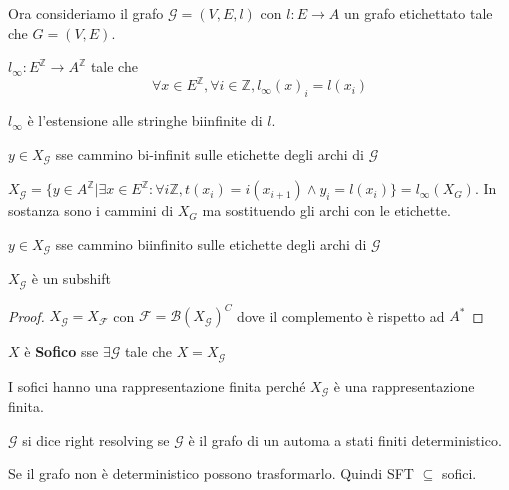 Ora consideriamo il grafo $\mathcal{G}=(V,E,l)$ con $l:E\to A$ un grafo etichettato 
tale che $G=(V,E)$.
\begin{definizione}
    $l_\infty:E^\mathbb{Z}\to A^\mathbb{Z}$ tale che 
    $$\forall x\in E^\mathbb{Z}, \forall i \in \mathbb{Z}, l_\infty(x)_i = l(x_i)$$
\end{definizione}
\begin{nota}
    $l_\infty$ è l'estensione alle stringhe biinfinite di $l$.
\end{nota}
\begin{nota}
    $y\in X_\mathcal{G}$ sse cammino bi-infinit sulle etichette degli archi di $\mathcal{G}$
\end{nota}

\begin{definizione}
    $X_\mathcal{G}= \{y\in A^\mathbb{Z}|\exists x\in E^\mathbb{Z} : \forall i \mathbb{Z}, t(x_i) = i(x_{i+1})\land y_i=l(x_i)\}=l_\infty(X_G)$.
    In sostanza sono i cammini di $X_G$ ma sostituendo gli archi con le etichette.
    
\end{definizione}

\begin{osservazione}
    $y\in X_\mathcal{G}$ sse cammino biinfinito sulle etichette degli archi di $\mathcal{G}$
\end{osservazione}
\begin{nota}
    $X_\mathcal{G}$ è un subshift
    \begin{proof}
        $X_\mathcal{G} = X_\mathcal{F}$ con $\mathcal{F}=\mathcal{B}(X_\mathcal{G})^C$
        dove il complemento è rispetto ad $A^\ast$
    \end{proof}
\end{nota}


\begin{definizione}
    $X$ è \textbf{Sofico} sse $\exists \mathcal{G}$ tale che $X= X_\mathcal{G}$
\end{definizione}

I sofici hanno una rappresentazione finita perché $X_\mathcal{G}$ è una rappresentazione 
finita. 

\begin{definizione}
    $\mathcal{G}$ si dice right resolving se $\mathcal{G}$ è il
    grafo di un automa a stati finiti deterministico.     
\end{definizione}

Se il grafo non è deterministico possono trasformarlo. Quindi SFT $\subseteq$ sofici.

